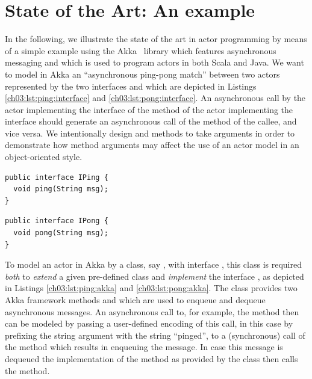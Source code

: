 \section{State of the Art: An example}
\label{ch03:sec:example}
In the following, we illustrate the state of the art in actor programming by means of a simple example using
the Akka~\cite{akka} library which features asynchronous messaging and which is used to program actors in both Scala and Java.
We want to model in Akka an ``asynchronous ping-pong match'' between two actors represented by the 
two interfaces  and  which are depicted in Listings \ref{ch03:lst:ping:interface} and \ref{ch03:lst:pong:interface}.
An asynchronous call by the actor implementing the  interface of the  method of the actor
implementing the  interface should generate an asynchronous call of the  method of the callee,
and vice versa.
We intentionally design  and  methods to take  arguments in order to demonstrate 
how method arguments may affect the use of an actor model in an object-oriented style.





\lstset{language=Java}
\begin{center}
\begin{minipage}[t]{0.48\textwidth}
\begin{lstlisting}[caption=Ping as an interface,label=lst:ping:interface]
public interface IPing {
  void ping(String msg);
}
\end{lstlisting}
\end{minipage}
\hfill
\begin{minipage}[t]{0.48\textwidth}
\begin{lstlisting}[caption=Pong as an interface,label=lst:pong:interface]
public interface IPong {
  void pong(String msg);
}
\end{lstlisting}
\end{minipage}
\end{center}

To model an actor in Akka by a class, say  ,  with interface , this class is required  \emph{both} to \emph{extend}
a given pre-defined  class   and \emph{implement} the interface , 
as depicted in Listings \ref{ch03:lst:ping:akka} and \ref{ch03:lst:pong:akka}.
The class  provides two Akka framework methods  and  
which are used to enqueue and dequeue asynchronous messages.
An asynchronous call to, for example,  the method  then can be modeled by passing a user-defined  encoding of this call,
in this case by prefixing the string argument with the string ``pinged'', to a (synchronous) call
of the  method which results in enqueuing the message.
In case this message is dequeued
the implementation of the  method as provided by the  class then calls the  method.

